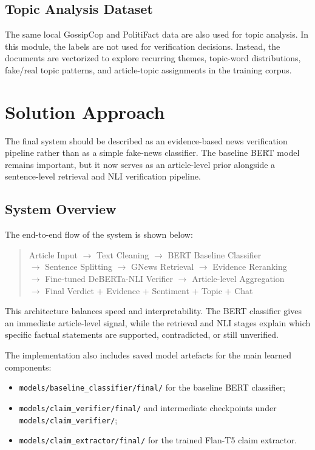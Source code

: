\documentclass[11pt]{article}
\newcommand{\code}[1]{\texttt{#1}}
\begin{document}
\subsection{Topic Analysis Dataset}

The same local GossipCop and PolitiFact data are also used for topic analysis.
In this module, the labels are not used for verification decisions. Instead, the
documents are vectorized to explore recurring themes, topic-word distributions,
fake/real topic patterns, and article-topic assignments in the training corpus.

\section{Solution Approach}

The final system should be described as an evidence-based news verification
pipeline rather than as a simple fake-news classifier. The baseline BERT model
remains important, but it now serves as an article-level prior alongside a
sentence-level retrieval and NLI verification pipeline.

\subsection{System Overview}

The end-to-end flow of the system is shown below:

\begin{quote}
\ttfamily
Article Input $\rightarrow$ Text Cleaning $\rightarrow$ BERT Baseline Classifier \\
$\rightarrow$ Sentence Splitting $\rightarrow$ GNews Retrieval $\rightarrow$ Evidence Reranking \\
$\rightarrow$ Fine-tuned DeBERTa-NLI Verifier $\rightarrow$ Article-level Aggregation \\
$\rightarrow$ Final Verdict + Evidence + Sentiment + Topic + Chat
\end{quote}

This architecture balances speed and interpretability. The BERT classifier gives
an immediate article-level signal, while the retrieval and NLI stages explain
which specific factual statements are supported, contradicted, or still
unverified.

The implementation also includes saved model artefacts for the main learned
components:

\begin{itemize}
    \item \code{models/baseline\_classifier/final/} for the baseline BERT classifier;
    \item \code{models/claim\_verifier/final/} and intermediate checkpoints under
    \code{models/claim\_verifier/};
    \item \code{models/claim\_extractor/final/} for the trained Flan-T5 claim extractor.
\end{itemize}
\end{document}
